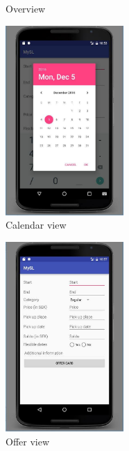 \documentclass[11pt,twoside,a4paper]{report}
\begin{document}
\begin{appendices}
\begin{figure}
	\centering
	\caption{Overview}
	\label{figure:overview}
\end{figure}

\begin{figure}
	\centering
	\includegraphics[width=0.4\textwidth]{jpg/android-calendar.jpg}
	\caption{Calendar view}
	\label{figure:calendar-view}
\end{figure}

\begin{figure}
	\centering
	\includegraphics[width=0.4\textwidth]{jpg/android-offer.jpg}
	\caption{Offer view}
	\label{figure:offer-view}
\end{figure}


\end{appendices}
\end{document}
